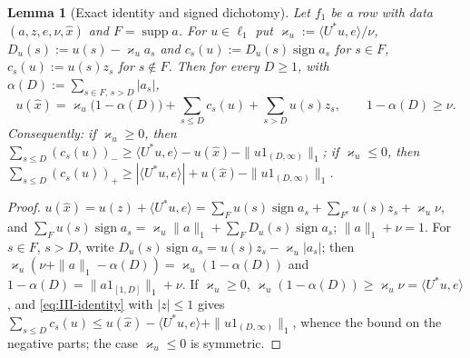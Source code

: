 \documentclass[10pt]{amsart}
\newtheorem{lemma}[theorem]{Lemma}
\theoremstyle{definition}
\theoremstyle{remark}
\newcommand{\supp}{\operatorname{supp}}
\newcommand{\sgn}{\operatorname{sign}}
\newcommand{\ip}[2]{\langle #1,#2\rangle}
\begin{document}
\begin{lemma}[Exact identity and signed dichotomy]\label{lem:III-identity}
Let $f_1$ be a row with data $(a,z,e,\nu,\hat x)$ and $F=\supp a$.  For $u\in
\ell_1$ put $\varkappa_u:=\ip{U^*u}{e}/\nu$, $D_u(s):=u(s)-\varkappa_ua_s$ and
$c_s(u):=D_u(s)\sgn a_s$ for $s\in F$, $c_s(u):=u(s)z_s$ for $s\notin F$.  Then
for every $D\ge1$, with $\alpha(D):=\sum_{s\in F,\,s>D}|a_s|$,
\begin{equation}\label{eq:III-identity}
 u(\hat x)=\varkappa_u\big(1-\alpha(D)\big)+\sum_{s\le D}c_s(u)+\sum_{s>D}
 u(s)z_s,\qquad1-\alpha(D)\ge\nu .
\end{equation}
Consequently: if $\varkappa_u\ge0$, then $\sum_{s\le D}(c_s(u))_-\ge
\ip{U^*u}{e}-u(\hat x)-\|u1_{(D,\infty)}\|_1$; if $\varkappa_u\le0$, then
$\sum_{s\le D}(c_s(u))_+\ge|\ip{U^*u}{e}|+u(\hat x)-\|u1_{(D,\infty)}\|_1$.
\end{lemma}

\begin{proof}
$u(\hat x)=u(z)+\ip{U^*u}{e}=\sum_Fu(s)\sgn a_s+\sum_{F^c}u(s)z_s+
\varkappa_u\nu$, and $\sum_Fu(s)\sgn a_s=\varkappa_u\|a\|_1+\sum_FD_u(s)\sgn a_s$;
$\|a\|_1+\nu=1$.  For $s\in F$, $s>D$, write $D_u(s)\sgn a_s=u(s)z_s-
\varkappa_u|a_s|$; then $\varkappa_u(\nu+\|a\|_1-\alpha(D))=\varkappa_u(1-
\alpha(D))$ and $1-\alpha(D)=\|a1_{[1,D]}\|_1+\nu$.  If $\varkappa_u\ge0$,
$\varkappa_u(1-\alpha(D))\ge\varkappa_u\nu=\ip{U^*u}{e}$, and
\eqref{eq:III-identity} with $|z|\le1$ gives $\sum_{s\le D}c_s(u)\le u(\hat x)-
\ip{U^*u}{e}+\|u1_{(D,\infty)}\|_1$, whence the bound on the negative parts;
the case $\varkappa_u\le0$ is symmetric.
\end{proof}
\end{document}
